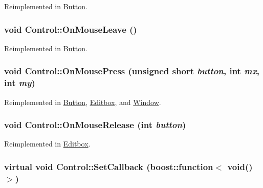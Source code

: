 Reimplemented in \hyperlink{class_button_69408b048737143eba5ab348e9208405}{Button}.\hypertarget{class_control_6f2e2b8b0984a37b64b9113a1fdf683d}{
\subsubsection[{OnMouseLeave}]{\setlength{\rightskip}{0pt plus 5cm}void Control::OnMouseLeave ()}}
\label{class_control_6f2e2b8b0984a37b64b9113a1fdf683d}




Reimplemented in \hyperlink{class_button_e6593ca8bb94fe3c54a09bf5cf060cf2}{Button}.\hypertarget{class_control_17ebdd745fcaf245f8d8ab38fa534072}{
\subsubsection[{OnMousePress}]{\setlength{\rightskip}{0pt plus 5cm}void Control::OnMousePress (unsigned short {\em button}, \/  int {\em mx}, \/  int {\em my})}}
\label{class_control_17ebdd745fcaf245f8d8ab38fa534072}




Reimplemented in \hyperlink{class_button_d6b93ae1c85c1dba05424becc7e051f7}{Button}, \hyperlink{class_editbox_c116bf79fae6dee06d3f65109b8ccc1c}{Editbox}, and \hyperlink{class_window_dcf06ec1829e73c79c0c3e4703463a03}{Window}.\hypertarget{class_control_7d95c48b4e3498938e52991e60a89181}{
\subsubsection[{OnMouseRelease}]{\setlength{\rightskip}{0pt plus 5cm}void Control::OnMouseRelease (int {\em button})}}
\label{class_control_7d95c48b4e3498938e52991e60a89181}




Reimplemented in \hyperlink{class_editbox_3426720f14c8827bc9838f76ff75ebc3}{Editbox}.\hypertarget{class_control_c4ea1db7ec1776ad19d7f81d5a01743e}{
\subsubsection[{SetCallback}]{\setlength{\rightskip}{0pt plus 5cm}virtual void Control::SetCallback (boost::function$<$ void()$>$)}}
\label{class_control_c4ea1db7ec1776ad19d7f81d5a01743e}


